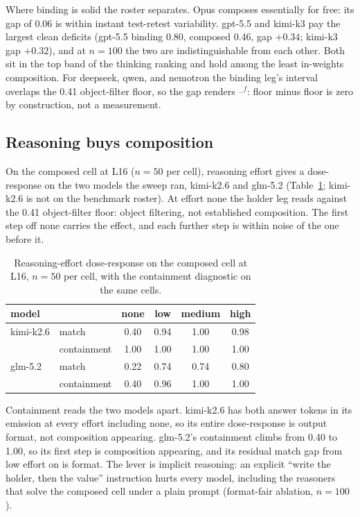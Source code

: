 \documentclass[11pt]{article}
\newcommand{\floorgap}{--$^{f}$}
\begin{document}
Where binding is solid the roster separates. Opus composes essentially for free: its gap of 0.06 is within instant test-retest variability. gpt-5.5 and kimi-k3 pay the largest clean deficits (gpt-5.5 binding 0.80, composed 0.46, gap $+0.34$; kimi-k3 gap $+0.32$), and at $n=100$ the two are indistinguishable from each other. Both sit in the top band of the thinking ranking and hold among the least in-weights composition. For deepseek, qwen, and nemotron
the binding leg's interval overlaps the 0.41 object-filter floor, so the gap renders
\floorgap: floor minus floor is zero by construction, not a measurement.

\subsection{Reasoning buys composition}

On the composed cell at L16 ($n=50$ per cell), reasoning effort gives a dose-response on the two
models the sweep ran, kimi-k2.6 and glm-5.2 (Table~\ref{tab:dose}; kimi-k2.6 is not on the
benchmark roster). At effort none the holder leg reads against the 0.41 object-filter
floor: object filtering, not established composition. The first step off none carries the
effect, and each further step is within noise of the one before it.

\begin{table}[h]
\centering
\begin{tabular}{llcccc}
\toprule
model & & none & low & medium & high \\
\midrule
kimi-k2.6 & match & 0.40 & 0.94 & 1.00 & 0.98 \\
          & containment & 1.00 & 1.00 & 1.00 & 1.00 \\
glm-5.2 & match & 0.22 & 0.74 & 0.74 & 0.80 \\
        & containment & 0.40 & 0.96 & 1.00 & 1.00 \\
\bottomrule
\end{tabular}
\caption{Reasoning-effort dose-response on the composed cell at L16, $n=50$ per cell, with the
containment diagnostic on the same cells.}
\label{tab:dose}
\end{table}

Containment reads the two models apart. kimi-k2.6 has both answer tokens in its emission at
every effort including none, so its entire dose-response is output format, not composition
appearing. glm-5.2's containment climbs from 0.40 to 1.00, so its first step is composition
appearing, and its residual match gap from low effort on is format. The lever is implicit
reasoning: an explicit ``write the holder, then the value'' instruction hurts every model,
including the reasoners that solve the composed cell under a plain prompt (format-fair
ablation, $n=100$).
\end{document}

